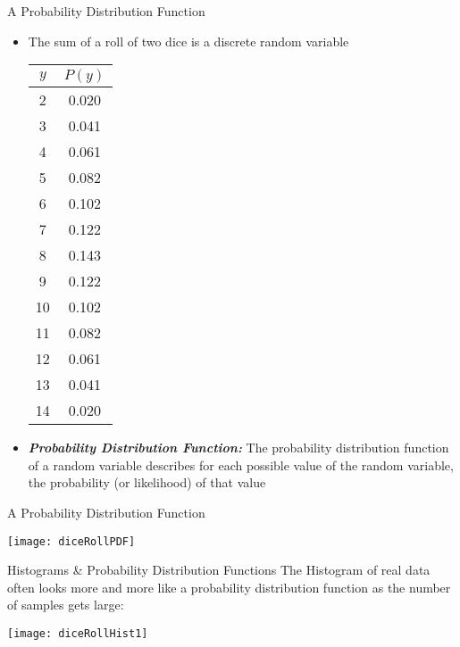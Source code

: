 \documentclass[xcolor=dvipsnames]{beamer}
\begin{document}
\begin{frame}{A Probability Distribution Function}
	\begin{itemize}
		\item The sum of a roll of two dice is a discrete random variable 
		\vspace{10pt}
		{ \tiny
			\begin{center}
				\begin{tabular}{|c|c|} \hline
					$y $ & $P(y)$  \\ \hline \hline
					2 &   0.020 \\ \hline
					3  &   0.041\\ \hline
					4  &   0.061\\ \hline
					5  &  0.082\\ \hline
					6  &  0.102\\ \hline
					7  &  0.122\\ \hline
					8  & 0.143 \\ \hline
					9  &   0.122\\ \hline
					10  & 0.102\\ \hline
					11  & 0.082\\ \hline
					12  & 0.061 \\ \hline
					13  &  0.041 \\ \hline
					14  & 0.020\\ \hline
				\end{tabular}
		\end{center}}
	\vspace{10pt}
		\item \emph{\textbf{Probability Distribution Function:}} The probability distribution function of a random variable describes for each possible value of the random variable, the probability (or likelihood) of that value
	\end{itemize}
\end{frame}

\begin{frame}{A Probability Distribution Function}
	\begin{center}
		\texttt{[image: diceRollPDF]}
	\end{center}
\end{frame}

\begin{frame}{Histograms \& Probability Distribution Functions}
	The Histogram of real data often looks more and more like a probability distribution function as the number of samples gets large:
	\begin{center}
		\texttt{[image: diceRollHist1]}
	\end{center}
\end{frame}
\end{document}
